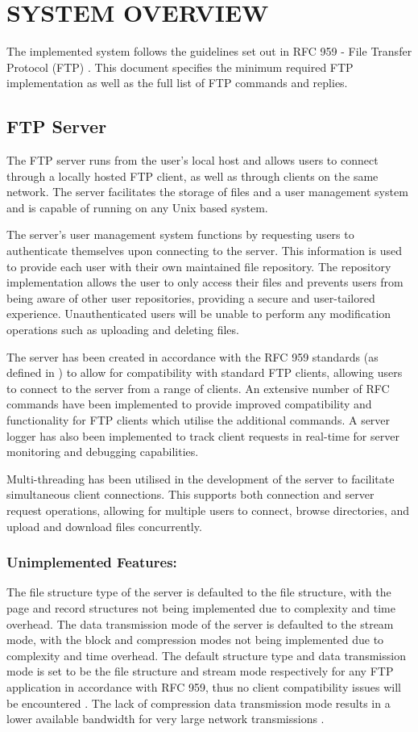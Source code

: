 \documentclass[10pt,twocolumn]{witseiepaper}
\begin{document}
\section{SYSTEM OVERVIEW}
The implemented system follows the guidelines set out in RFC 959 - File Transfer Protocol (FTP) \cite{rfc}. This document specifies the minimum required FTP implementation as well as the full list of FTP commands and replies.

\subsection{FTP Server}
The FTP server runs from the user's local host and allows users to connect through a locally hosted FTP client, as well as through clients on the same network. The server facilitates the storage of files and a user management system and is capable of running on any Unix based system.

The server's user management system functions by requesting users to authenticate themselves upon connecting to the server. This information is used to provide each user with their own maintained file repository. The repository implementation allows the user to only access their files and prevents users from being aware of other user repositories, providing a secure and user-tailored experience. Unauthenticated users will be unable to perform any modification operations such as uploading and deleting files.

The server has been created in accordance with the RFC 959 standards (as defined in \cite{rfc}) to allow for compatibility with standard FTP clients, allowing users to connect to the server from a range of clients. An extensive number of RFC commands have been implemented to provide improved compatibility and functionality for FTP clients which utilise the additional commands. A server logger has also been implemented to track client requests in real-time for server monitoring and debugging capabilities.

Multi-threading has been utilised in the development of the server to facilitate simultaneous client connections. This supports both connection and server request operations, allowing for multiple users to connect, browse directories, and upload and download files concurrently.

\subsubsection*{Unimplemented Features:}
The file structure type of the server is defaulted to the file structure, with the page and record structures not being implemented due to complexity and time overhead. The data transmission mode of the server is defaulted to the stream mode, with the block and compression modes not being implemented due to complexity and time overhead. The default structure type and data transmission mode is set to be the file structure and stream mode respectively for any FTP application in accordance with RFC 959, thus no client compatibility issues will be encountered \cite{rfc}. The lack of compression data transmission mode results in a lower available bandwidth for very large network transmissions \cite{rfc}.
\end{document}
